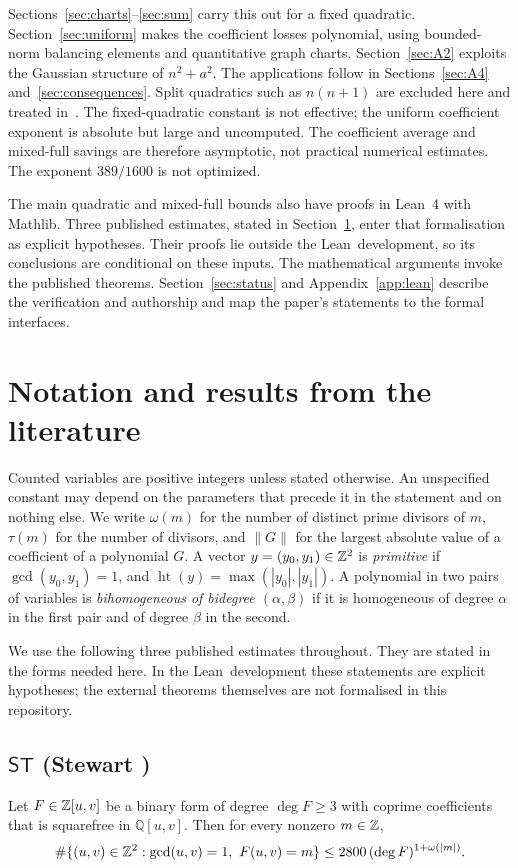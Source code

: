 \documentclass[11pt,reqno]{amsart}
\theoremstyle{definition}
\theoremstyle{remark}
\numberwithin{equation}{section}
\newcommand{\Q}{\mathbb Q}\newcommand{\C}{\mathbb C}
\newcommand{\ST}{\mathsf{ST}}\newcommand{\CC}{\mathsf{CC}}\newcommand{\GE}{\mathsf{GE}}
\newcommand{\lean}{Lean}
\newcommand{\hgt}{\operatorname{ht}}
\begin{document}
Sections~\ref{sec:charts}--\ref{sec:sum} carry this out for a fixed
quadratic. Section~\ref{sec:uniform} makes the coefficient losses
polynomial, using bounded-norm balancing elements and quantitative graph
charts. Section~\ref{sec:A2} exploits the Gaussian structure of $n^2+a^2$.
The applications follow in Sections~\ref{sec:A4} and~\ref{sec:consequences}.
Split quadratics such as $n(n+1)$ are excluded here and treated
in~\cite{powerful}. The fixed-quadratic constant is not effective; the
uniform coefficient exponent is absolute but large and uncomputed.
The coefficient average and mixed-full savings are therefore asymptotic,
not practical numerical estimates. The exponent $389/1600$ is not optimized.

The main quadratic and mixed-full bounds also have proofs in \lean~4
with Mathlib. Three published estimates, stated in
Section~\ref{sec:cited}, enter that formalisation as explicit hypotheses.
Their proofs lie outside the \lean\ development, so its conclusions are
conditional on these inputs. The mathematical arguments invoke the
published theorems. Section~\ref{sec:status}
and Appendix~\ref{app:lean} describe the verification and authorship and
map the paper's statements to the formal interfaces.

\section{Notation and results from the literature}\label{sec:cited}
Counted variables are positive integers unless stated otherwise. An
unspecified constant may depend on the parameters that precede it in the
statement and on nothing else. We write $\omega(m)$ for the number of
distinct prime divisors of $m$, $\tau(m)$ for the number of divisors, and
$\|G\|$ for the largest absolute value of a coefficient of a polynomial
$G$. A vector $y=(y_0,y_1)\in\mathbb Z^2$ is \emph{primitive} if
$\gcd(y_0,y_1)=1$, and $\hgt(y)=\max(|y_0|,|y_1|)$. A polynomial in two
pairs of variables is \emph{bihomogeneous of bidegree $(\alpha,\beta)$} if
it is homogeneous of degree $\alpha$ in the first pair and of degree
$\beta$ in the second.

We use the following three published estimates throughout. They are stated
in the forms needed here. In the \lean\ development these statements are
explicit hypotheses; the external theorems themselves are not formalised
in this repository.

\subsection*{$\ST$ (Stewart \cite[Theorem~1 and p.~796]{stewart})}
Let $F\in\mathbb Z[u,v]$ be a binary form of degree $\deg F\ge3$ with coprime
coefficients that is squarefree in $\Q[u,v]$. Then for every nonzero
$m\in\mathbb Z$,
\[
 \card\{(u,v)\in\Z^2:\gcd(u,v)=1,\ F(u,v)=m\}\le2800\,(\deg F)^{1+\omega(|m|)}.
\]
\end{document}
